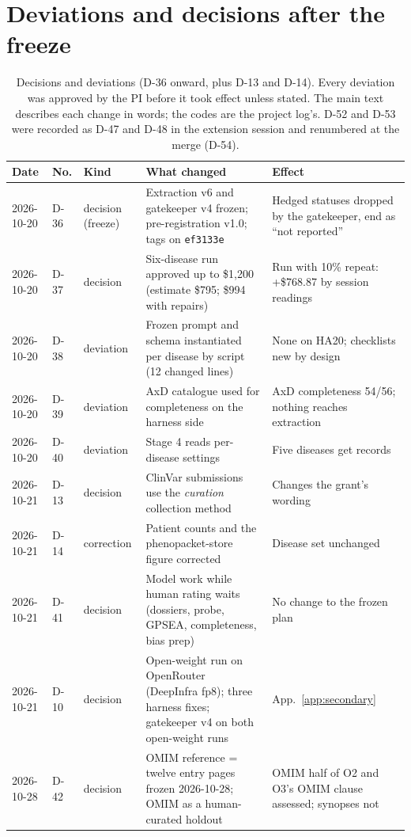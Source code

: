 \documentclass{article} %
\begin{document}
\section{Deviations and decisions after the freeze}
\label{app:deviations}
\begin{table}[h]
\caption{Decisions and deviations (D-36 onward, plus D-13 and D-14). Every deviation was approved by the PI before it took effect unless stated. The main text describes each change in words; the codes are the project log's. D-52 and D-53 were recorded as D-47 and D-48 in the extension session and renumbered at the merge (D-54).}
\begin{center}
\scriptsize
\begin{tabular}{p{1.5cm}p{0.7cm}p{1.4cm}p{4.1cm}p{3.8cm}}
\toprule
Date & No. & Kind & What changed & Effect \\
\midrule
2026-10-20 & D-36 & decision (freeze) & Extraction v6 and gatekeeper v4 frozen; pre-registration v1.0; tags on \texttt{ef3133e} & Hedged statuses dropped by the gatekeeper, end as ``not reported'' \\
2026-10-20 & D-37 & decision & Six-disease run approved up to \$1,200 (estimate \$795; \$994 with repairs) & Run with 10\% repeat: +\$768.87 by session readings \\
2026-10-20 & D-38 & deviation & Frozen prompt and schema instantiated per disease by script (12 changed lines) & None on HA20; checklists new by design \\
2026-10-20 & D-39 & deviation & AxD catalogue used for completeness on the harness side & AxD completeness 54/56; nothing reaches extraction \\
2026-10-20 & D-40 & deviation & Stage 4 reads per-disease settings & Five diseases get records \\
2026-10-21 & D-13 & decision & ClinVar submissions use the \emph{curation} collection method & Changes the grant's wording \\
2026-10-21 & D-14 & correction & Patient counts and the phenopacket-store figure corrected & Disease set unchanged \\
2026-10-21 & D-41 & decision & Model work while human rating waits (dossiers, probe, GPSEA, completeness, bias prep) & No change to the frozen plan \\
2026-10-21 & D-10 & decision & Open-weight run on OpenRouter (DeepInfra fp8); three harness fixes; gatekeeper v4 on both open-weight runs & App.~\ref{app:secondary} \\
2026-10-28 & D-42 & decision & OMIM reference = twelve entry pages frozen 2026-10-28; OMIM as a human-curated holdout & OMIM half of O2 and O3's OMIM clause assessed; synopses not \\

\end{tabular}
\end{center}
\end{table}
\end{document}
